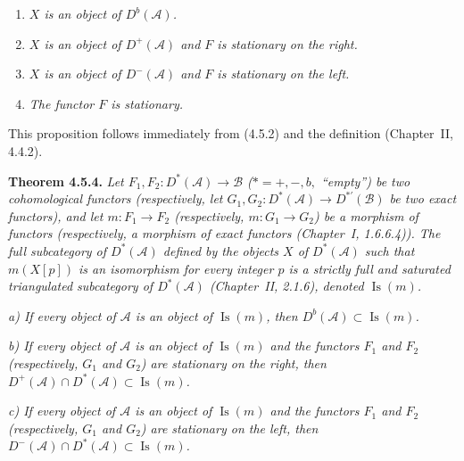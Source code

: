 \clearpage
{}%
\begingroup\small\setlength{\parskip}{0pt}\setlength{\emergencystretch}{1.5em}
\setlength{\abovedisplayskip}{4pt plus 2pt minus 2pt}%
\setlength{\belowdisplayskip}{4pt plus 2pt minus 2pt}%

\begin{enumerate}
\item[1)] \textit{$X$ is an object of $D^b(\mathcal A)$.}
\item[2)] \textit{$X$ is an object of $D^+(\mathcal A)$ and $F$ is
stationary on the right.}
\item[3)] \textit{$X$ is an object of $D^-(\mathcal A)$ and $F$ is
stationary on the left.}
\item[4)] \textit{The functor $F$ is stationary.}
\end{enumerate}

This proposition follows immediately from (4.5.2) and the definition
(Chapter~II, 4.4.2).

\medskip\noindent\textbf{Theorem 4.5.4.}\quad
\textit{Let
$F_1,F_2\colon D^*(\mathcal A)\longrightarrow\mathcal B$
($*=+,-,b,{}$ ``empty'') be two cohomological functors (respectively, let
$G_1,G_2\colon D^*(\mathcal A)\longrightarrow D^{*'}(\mathcal B)$ be two
exact functors), and let $m\colon F_1\longrightarrow F_2$ (respectively,
$m\colon G_1\longrightarrow G_2$) be a morphism of functors (respectively,
a morphism of exact functors (Chapter~I, 1.6.6.4)). The full subcategory of
$D^*(\mathcal A)$ defined by the objects $X$ of $D^*(\mathcal A)$ such that
$m(X[p])$ is an isomorphism for every integer $p$ is a strictly full and
saturated triangulated subcategory of $D^*(\mathcal A)$ (Chapter~II,
2.1.6), denoted $\operatorname{Is}(m)$.}

\noindent\textit{a) If every object of $\mathcal A$ is an object of
$\operatorname{Is}(m)$, then
$D^b(\mathcal A)\subset\operatorname{Is}(m)$.}

\noindent\textit{b) If every object of $\mathcal A$ is an object of
$\operatorname{Is}(m)$ and the functors $F_1$ and $F_2$ (respectively,
$G_1$ and $G_2$) are stationary on the right, then
$D^+(\mathcal A)\cap D^*(\mathcal A)\subset\operatorname{Is}(m)$.}

\noindent\textit{c) If every object of $\mathcal A$ is an object of
$\operatorname{Is}(m)$ and the functors $F_1$ and $F_2$ (respectively,
$G_1$ and $G_2$) are stationary on the left, then
$D^-(\mathcal A)\cap D^*(\mathcal A)\subset\operatorname{Is}(m)$.}


